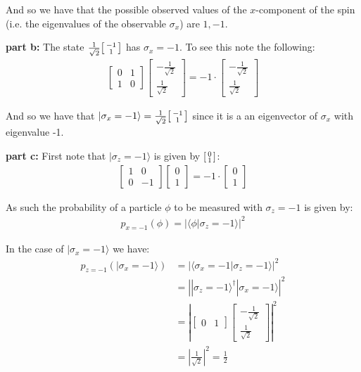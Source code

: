 \documentclass{article}
\newcommand{\icol}[1]{%
  \begin{bsmallmatrix}#1\end{bsmallmatrix}%
}
\begin{document}
And so we have that the possible observed values of the $x$-component of the spin (i.e. the eigenvalues of the observable $\sigma_x$) are $1,-1$.
\bigskip

\noindent\textbf{part b:} The state $\frac{1}{\sqrt{2}}\icol{-1\\1}$ has $\sigma_x=-1$. To see this note the following:
\begin{align*}
    \begin{bmatrix}
        0&1\\1&0
    \end{bmatrix}\begin{bmatrix}
        -\frac{1}{\sqrt{2}}\\\frac{1}{\sqrt{2}}
    \end{bmatrix}=-1\cdot\begin{bmatrix}
        -\frac{1}{\sqrt{2}}\\\frac{1}{\sqrt{2}}
    \end{bmatrix}
\end{align*} 

And so we have that $|\sigma_x=-1\rangle=\frac{1}{\sqrt{2}}\icol{-1\\1}$ since it is a an eigenvector of $\sigma_x$ with eigenvalue -1.
\bigskip
\newpage

\noindent\textbf{part c:} First note that $|\sigma_z=-1\rangle$ is given by $\icol{0\\1}$:
\begin{align*}
    \begin{bmatrix}
        1&0\\0&-1
    \end{bmatrix}\begin{bmatrix}
        0\\1
    \end{bmatrix}=-1\cdot\begin{bmatrix}
        0\\1
    \end{bmatrix}
\end{align*} 

As such the probability of a particle $\phi$ to be measured with $\sigma_z=-1$ is given by:
\begin{align*}
    p_{x=-1}(\phi)=\left|\langle\phi|\sigma_z=-1\rangle\right|^2
\end{align*}

In the case of $|\sigma_x=-1\rangle$ we have:
\begin{align*}
    p_{z=-1}(|\sigma_x=-1\rangle)&=\left|\langle\sigma_x=-1|\sigma_z=-1\rangle\right|^2\\
    &=\left||\sigma_z=-1\rangle^\dagger|\sigma_x=-1\rangle\right|^2\\
    &=\left|\begin{bmatrix}
        0&1
    \end{bmatrix}\begin{bmatrix}
        -\frac{1}{\sqrt{2}}\\\frac{1}{\sqrt{2}}
    \end{bmatrix}\right|^2\\
    &=\left|\frac{1}{\sqrt{2}}\right|^2=\frac{1}{2}
\end{align*}
\end{document}
